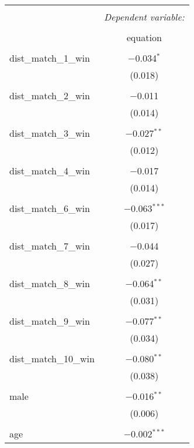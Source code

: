 
\begin{table}[!htbp] \centering 
  \caption{} 
  \label{} 
\begin{tabular}{@{\extracolsep{5pt}}lc} 
\\[-1.8ex]\hline 
\hline \\[-1.8ex] 
 & \multicolumn{1}{c}{\textit{Dependent variable:}} \\ 
\cline{2-2} 
\\[-1.8ex] & equation \\ 
\hline \\[-1.8ex] 
 dist\_match\_1\_win & $-$0.034$^{*}$ \\ 
  & (0.018) \\ 
  & \\ 
 dist\_match\_2\_win & $-$0.011 \\ 
  & (0.014) \\ 
  & \\ 
 dist\_match\_3\_win & $-$0.027$^{**}$ \\ 
  & (0.012) \\ 
  & \\ 
 dist\_match\_4\_win & $-$0.017 \\ 
  & (0.014) \\ 
  & \\ 
 dist\_match\_6\_win & $-$0.063$^{***}$ \\ 
  & (0.017) \\ 
  & \\ 
 dist\_match\_7\_win & $-$0.044 \\ 
  & (0.027) \\ 
  & \\ 
 dist\_match\_8\_win & $-$0.064$^{**}$ \\ 
  & (0.031) \\ 
  & \\ 
 dist\_match\_9\_win & $-$0.077$^{**}$ \\ 
  & (0.034) \\ 
  & \\ 
 dist\_match\_10\_win & $-$0.080$^{**}$ \\ 
  & (0.038) \\ 
  & \\ 
 male & $-$0.016$^{**}$ \\ 
  & (0.006) \\ 
  & \\ 
 age & $-$0.002$^{***}$ \\ 

\end{tabular}
\end{table}
